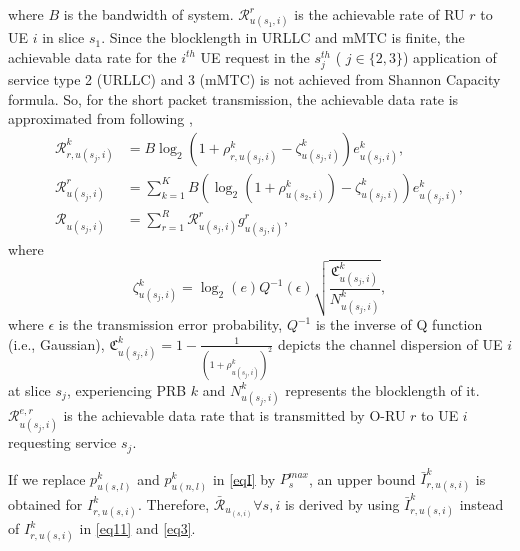 \documentclass[lettersize,journal]{IEEEtran}
\begin{document}
where $B$ is the bandwidth of system. 
$\mathcal{R}_{u(s_1,i)}^{r}$ is the achievable rate of RU $r$ to UE $i$ in slice $s_1$.
Since the blocklength in URLLC and mMTC is finite, the achievable data rate for the $i^{th}$ UE request in the $s_{j}^{th}$ ( $j \in \{2,3\}$) application of service type 2 (URLLC) and 3 (mMTC) is not achieved from Shannon Capacity formula. So, for the short packet transmission, the achievable data rate is approximated from following \cite{setayesh2020joint},
\begin{subequations}\label{eq11}
\begin{alignat}{4}
\mathcal{{R}}_{r,u(s_j,i)}^{k} &= B \log_2({1+ \rho_{r,u(s_j,i)}^{k}} - \zeta_{u(s_j,i)}^{k}){e}_{u(s_j,i)}^{k},\\
\mathcal{R}_{u(s_j,i)}^{r} &= \sum_{k=1}^{K} B (\log_2({1+ \rho_{u(s_2,i)}^{k}})- \zeta_{u(s_j,i)}^{k}){e}_{u(s_j,i)}^{k},\\
\mathcal{R}_{u(s_j,i)} &= \sum_{r=1}^{R}\mathcal{R}_{u(s_j,i)}^{r} g^r_{u(s_j,i)},
\end{alignat}
\end{subequations}
where %
\begin{equation}\label{shortPacket}
 \zeta_{u(s_j,i)}^{k} = \log_2({e})Q^{-1}(\epsilon) \sqrt{\frac{\mathfrak{C}_{u(s_j,i)}^{k}}{N_{u(s_j,i)}^{k}}}, 
\end{equation}
where $\epsilon$ is the transmission error probability, $Q^{-1}$ is the inverse of Q function (i.e., Gaussian),
$\mathfrak{C}_{u(s_j,i)}^{k} = 1 - \frac{1}{(1+\rho_{u(s_j,i)}^{k})^2}$ depicts the channel dispersion of UE  $i$ at slice $s_j$, experiencing PRB $k$ and
$N_{u(s_j,i)}^{k}$ represents the blocklength of it. 
$\mathcal{R}_{u(s_j,i)}^{e,r}$ is the achievable data rate that is transmitted by O-RU $r$ to UE $i$ requesting service $s_j$.

If we replace $p_{u(s,l)}^{k}$ and $p_{u(n,l)}^{k}$ in \eqref{eqI} by $P_{s}^{max}$, an upper bound $\bar{I}_{r,u(s,i)}^{k}$ is obtained for $I_{r,u(s,i)}^{k}$. Therefore, $\bar{\mathcal{R}}_{u_{(s,i)}} \forall s , i$ is derived by using $\bar{I}_{r,u(s,i)}^{k}$ instead of $I_{r,u(s,i)}^{k}$ in  \eqref{eq11} and \eqref{eq3}.
\end{document}
